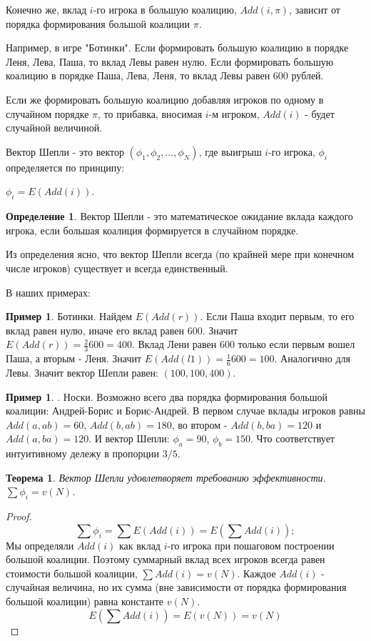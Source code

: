 \documentclass[pdftex,12pt,a4paper]{article}
\numberwithin{equation}{page} %
\newtheorem{theorem}[equation]{Теорема} %
\theoremstyle{definition} %
\newtheorem{definition}[equation]{Определение}
\theoremstyle{definition}
\newtheorem{myex}[equation]{Пример}
\theoremstyle{definition}
\begin{document}
Конечно же, вклад $i$-го игрока в большую коалицию, $Add(i,\pi)$, зависит от порядка формирования большой коалиции $\pi$. 

Например, в игре "Ботинки". Если формировать большую коалицию в порядке Леня, Лева, Паша, то вклад Левы равен нулю. Если формировать большую коалицию в порядке Паша, Лева, Леня, то вклад Левы равен 600 рублей.

Если же формировать большую коалицию добавляя игроков по одному в случайном порядке $\pi$, то прибавка, вносимая $i$-м игроком, $Add(i)$ - будет случайной величиной.

Вектор Шепли - это вектор $(\phi_{1},\phi_{2},...,\phi_{N})$, где выигрыш $i$-го игрока, $\phi_{i}$ определяется по принципу:

$\phi_{i}=E(Add(i))$.

\begin{definition} Вектор Шепли - это математическое ожидание вклада каждого игрока, если большая коалиция формируется в случайном порядке.
\end{definition}

Из определения ясно, что вектор Шепли всегда (по крайней мере при конечном числе игроков) существует и всегда единственный.

В наших примерах:

\begin{myex} Ботинки. Найдем $E(Add(r))$. Если Паша входит первым, то его вклад равен нулю, иначе его вклад равен 600. Значит $E(Add(r))=\frac{2}{3}600=400$. Вклад Лени равен 600 только если первым вошел Паша, а вторым - Леня. Значит $E(Add(l1))=\frac{1}{6}600=100$. Аналогично для Левы. Значит вектор Шепли равен: $(100,100,400)$.
\end{myex}

\begin{myex}. Носки. Возможно всего два порядка формирования большой коалиции: Андрей-Борис и Борис-Андрей. В первом случае вклады игроков равны $Add(a,ab)=60$, $Add(b,ab)=180$, во втором - $Add(b,ba)=120$ и $Add(a,ba)=120$. И вектор Шепли: $\phi_{a}=90$, $\phi_{b}=150$. Что соответствует интуитивному дележу в пропорции $3/5$.
\end{myex}


\begin{theorem} Вектор Шепли удовлетворяет требованию эффективности. $\sum \phi_{i}=v(N)$.
\end{theorem}
\begin{proof}
$$\sum \phi_{i}=\sum E(Add(i))=E (\sum Add(i));$$
Мы определяли $Add(i)$ как вклад $i$-го игрока при пошаговом построении большой коалиции. Поэтому суммарный вклад всех игроков всегда равен стоимости большой коалиции, $\sum Add(i)=v(N)$. Каждое $Add(i)$ - случайная величина, но их сумма (вне зависимости от порядка формирования большой коалиции) равна константе $v(N)$.
$$E(\sum Add(i))=E(v(N))=v(N)$$
\end{proof}
\end{document}
